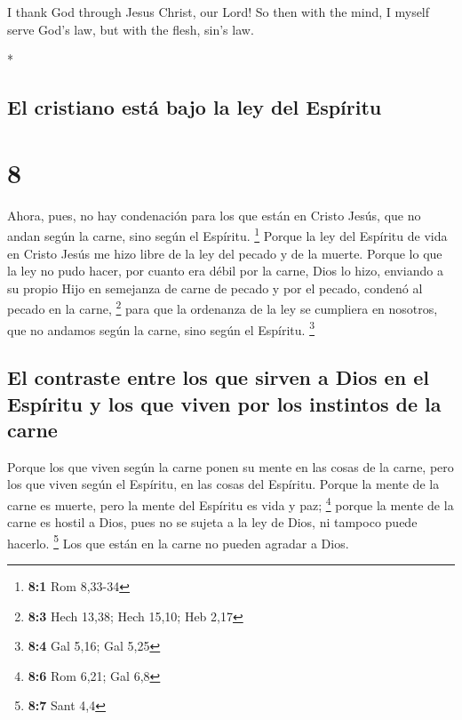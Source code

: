 \begin{paracol}{2}
\begin{otherlanguage}{english}
 I thank God through Jesus Christ, our Lord! So then with
the mind, I myself serve God's law, but with the flesh, sin's law.

\end{otherlanguage}

\switchcolumn[0]*

\hypertarget{el-cristiano-estuxe1-bajo-la-ley-del-espuxedritu}{%
\subsection{El cristiano está bajo la ley del
Espíritu}\label{el-cristiano-estuxe1-bajo-la-ley-del-espuxedritu}}

\hypertarget{section-14}{%
\section{8}\label{section-14}}

 Ahora, pues, no hay condenación para los que están en
Cristo Jesús, que no andan según la carne, sino según el Espíritu.
\footnote{\textbf{8:1} Rom 8,33-34}  Porque la ley del
Espíritu de vida en Cristo Jesús me hizo libre de la ley del pecado y de
la muerte.  Porque lo que la ley no pudo hacer, por cuanto
era débil por la carne, Dios lo hizo, enviando a su propio Hijo en
semejanza de carne de pecado y por el pecado, condenó al pecado en la
carne, \footnote{\textbf{8:3} Hech 13,38; Hech 15,10; Heb 2,17}
 para que la ordenanza de la ley se cumpliera en nosotros,
que no andamos según la carne, sino según el Espíritu. \footnote{\textbf{8:4}
  Gal 5,16; Gal 5,25}

\hypertarget{el-contraste-entre-los-que-sirven-a-dios-en-el-espuxedritu-y-los-que-viven-por-los-instintos-de-la-carne}{%
\subsection{El contraste entre los que sirven a Dios en el Espíritu y
los que viven por los instintos de la
carne}\label{el-contraste-entre-los-que-sirven-a-dios-en-el-espuxedritu-y-los-que-viven-por-los-instintos-de-la-carne}}

 Porque los que viven según la carne ponen su mente en las
cosas de la carne, pero los que viven según el Espíritu, en las cosas
del Espíritu.  Porque la mente de la carne es muerte, pero
la mente del Espíritu es vida y paz; \footnote{\textbf{8:6} Rom 6,21;
  Gal 6,8}  porque la mente de la carne es hostil a Dios,
pues no se sujeta a la ley de Dios, ni tampoco puede hacerlo.
\footnote{\textbf{8:7} Sant 4,4}  Los que están en la
carne no pueden agradar a Dios.


\end{paracol}
